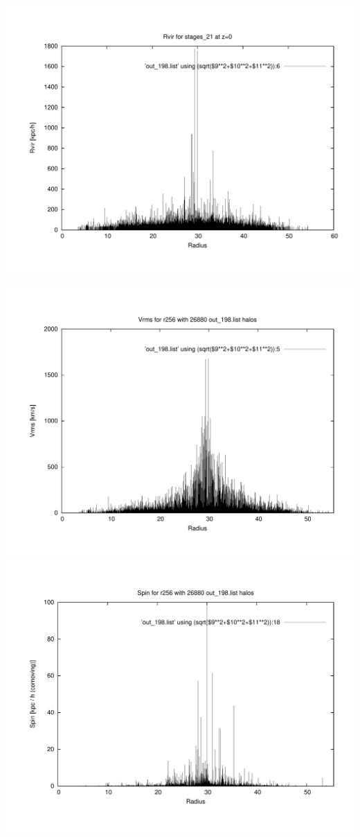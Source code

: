 \includegraphics[scale=0.3]{r256/stages_21/plot_rvir_z0.pdf}

\includegraphics[scale=0.3]{r256/stages_21/plot_Vrms_out_198.pdf}
\includegraphics[scale=0.3]{r256/stages_21/plot_spin_out_198.pdf}

